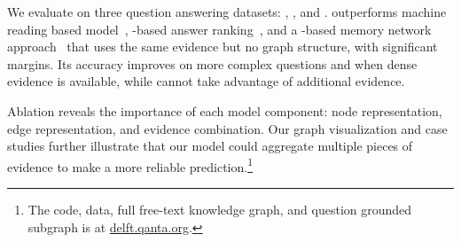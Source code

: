 We evaluate \name{} on three question answering
datasets: \qblink{},  \qanta{}, and \triviaqa{}.
%
\name{} outperforms machine reading based model~\cite{chen2017reading},
-based answer ranking~\cite{devlin2018bert}, and a -based memory
network approach~\cite{weston2014memory} that uses the same evidence
but no graph structure, with significant margins.
%
Its accuracy improves on more complex questions and when dense
evidence is available, while  cannot take advantage of
additional evidence.

Ablation reveals the importance of each model component: node
representation, edge representation, and evidence combination.
Our graph visualization and case studies further illustrate that our
model could aggregate multiple pieces of evidence to make a more
reliable prediction.\footnote{The code, data, full free-text knowledge graph, and question grounded subgraph
is at \url{delft.qanta.org}. }
